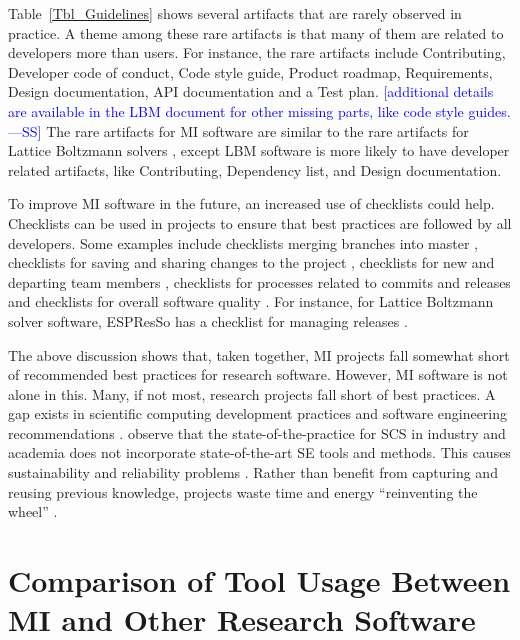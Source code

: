 \documentclass[final, 3p, times, authoryear]{elsarticle}
\newcommand{\authornote}[3]{\textcolor{#1}{[#3 ---#2]}}
\newcommand{\authornote}[3]{}
\newcommand{\wss}[1]{\authornote{blue}{SS}{#1}} %
\begin{document}
Table~\ref{Tbl_Guidelines} shows several artifacts that are rarely observed in
practice.  A theme among these rare artifacts is that many of them are related
to developers more than users.  For instance, the rare artifacts include
Contributing, Developer code of conduct, Code style guide, Product roadmap,
Requirements, Design documentation, API documentation and a Test plan.
\wss{additional details are available in the LBM document for other missing
parts, like code style guides.}  The rare artifacts for MI software are similar
to the rare artifacts for Lattice Boltzmann solvers \citep{Michalski2021},
except LBM software is more likely to have developer related artifacts, like
Contributing, Dependency list, and Design documentation.

To improve MI software in the future, an increased use of checklists could help.
Checklists can be used in projects to ensure that best practices are followed by
all developers.  Some examples include checklists merging branches into master
\citep{Brown2015}, checklists for saving and sharing changes to the project
\citep{WilsonEtAl2016}, checklists for new and departing team members
\citep{HerouxAndBernholdt2018}, checklists for processes related to commits and
releases \citep{HerouxEtAl2008} and checklists for overall software quality
\citep{ThielEtAl2020, SSI2022}.  For instance, for Lattice Boltzmann solver
software, ESPResSo has a checklist for managing releases \citep{Michalski2021}. 

The above discussion shows that, taken together, MI projects fall somewhat short
of recommended best practices for research software.  However, MI software is
not alone in this.  Many, if not most, research projects fall short of best
practices.  A gap exists in scientific computing development practices and
software engineering recommendations \citep{Storer2017, Kelly2007,
OwojaiyeEtAl2021_CSE}. \citet{JohansonAndHasselbring2018} observe that the
state-of-the-practice for SCS in industry and academia does not incorporate
state-of-the-art SE tools and methods.  This causes sustainability and
reliability problems \citep{FaulkEtAl2009}. Rather than benefit from capturing
and reusing previous knowledge, projects waste time and energy ``reinventing the
wheel'' \citep{deSouzaEtAl2019}.

\section{Comparison of Tool Usage Between MI and Other Research Software}
\label{Sec_CompareTools}
\end{document}
